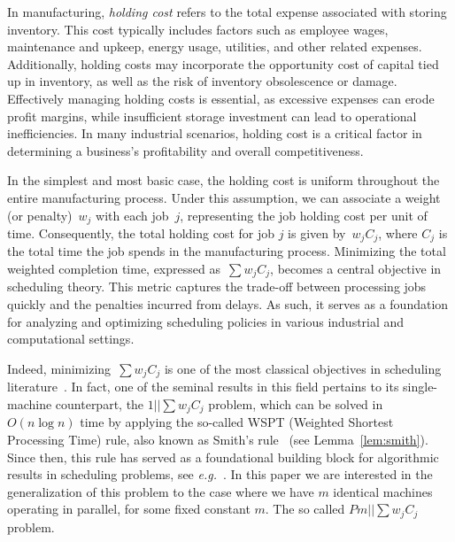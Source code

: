 \documentclass[11pt]{llncs}
\begin{document}
In manufacturing, \emph{holding cost} refers to the total expense associated with storing inventory. This cost typically includes factors such as employee wages, maintenance and upkeep, energy usage, utilities, and other related expenses. Additionally, holding costs may incorporate the opportunity cost of capital tied up in inventory, as well as the risk of inventory obsolescence or damage. Effectively managing holding costs is essential, as excessive expenses can erode profit margins, while insufficient storage investment can lead to operational inefficiencies. In many industrial scenarios, holding cost is a critical factor in determining a business's profitability and overall competitiveness.

In the simplest and most basic case, the holding cost is uniform throughout the entire manufacturing process. Under this assumption, we can associate a weight (or penalty)~$w_j$ with each job~$j$, representing the job holding cost per unit of time. Consequently, the total holding cost for job $j$ is given by~$w_j C_j$, where $C_j$ is the total time the job spends in the manufacturing process. Minimizing the total weighted completion time, expressed as~$\sum w_j C_j$, becomes a central objective in scheduling theory. This metric captures the trade-off between processing jobs quickly and the penalties incurred from delays. As such, it serves as a foundation for analyzing and optimizing scheduling policies in various industrial and computational settings.


Indeed, minimizing~$\sum w_jC_j$ is one of the most classical objectives in scheduling literature~\cite{Pinedo2008}. In fact, one of the seminal results in this field pertains to its single-machine counterpart, the $1||\sum w_j C_j$ problem, which can be solved in  $O(n \log n)$ time by applying the so-called WSPT (Weighted Shortest Processing Time) rule, also known as Smith's rule~\cite{Smith1956} (see Lemma~\ref{lem:smith}). Since then, this rule has served as a foundational building block for algorithmic results in scheduling problems, see \emph{e.g.}~\cite{HohnJacobs2015,Nicole,DBLP:conf/stoc/SkutellaW99,Weiss92}. In this paper we are interested in the generalization of this problem to the case where we have $m$ identical machines operating in parallel, for some fixed constant $m$. The so called $Pm||\sum w_j C_j$ problem. 
\end{document}
